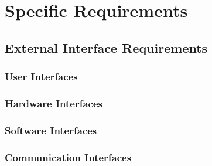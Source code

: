 \documentclass[11pt,a4paper]{report}
\begin{document}
\chapter{Specific Requirements}
\section{External Interface Requirements}
\subsection{User Interfaces}
\subsection{Hardware Interfaces}
\subsection{Software Interfaces}
\subsection{Communication Interfaces}
\end{document}
